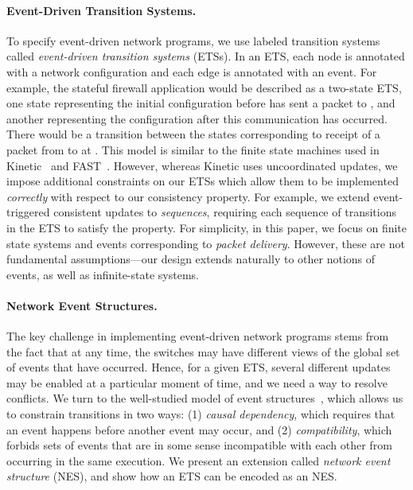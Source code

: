 \documentclass[pldi-cameraready]{sigplanconf}
\begin{document}
\paragraph*{Event-Driven Transition Systems.}
To specify event-driven network programs, we use labeled
transition systems called {\em event-driven transition systems} (ETSs). In
an ETS, each node is annotated with a network configuration and each
edge is annotated with an event. For example, the stateful
firewall application would be described as a two-state ETS,
one state representing the initial configuration before
 has sent a packet to , and another representing the
configuration after this communication has occurred. There would be a
transition between the states corresponding to receipt of a packet from  to
 at . This model is similar to the finite state machines
used in Kinetic~\cite{kim2015kinetic} and FAST~\cite{moshref2014flow}.
However, whereas Kinetic uses uncoordinated updates,
we impose additional constraints on our ETSs which allow 
them to be implemented {\em correctly} with respect to
our consistency property. For example, we extend event-triggered
consistent updates to {\em sequences}, requiring each sequence of transitions in
the ETS to satisfy the property.
For simplicity, in this paper, we focus on finite state systems and events
corresponding to {\em packet delivery}. However, these are
not fundamental assumptions---our design extends naturally to other
notions of events, as well as infinite-state systems.

\paragraph*{Network Event Structures.}
The key challenge in implementing event-driven network programs
stems from the fact that at any time, the switches may have
different views of the global set of events that have occurred.
Hence, for a given ETS, several different updates may be
enabled at a particular moment of time, and we need a way to resolve
conflicts. We turn to the well-studied model of event
structures~\cite{winskel1987event}, which allows us to constrain transitions in two ways:
(1) {\em causal dependency}, which requires that an event 
happens before another event  may occur, and (2) {\em compatibility},
which forbids sets of events that are in some sense
incompatible with each other from occurring in the same execution.
We present an extension called {\em network event structure} (NES), and
show how an ETS can be encoded as an NES.
\end{document}
